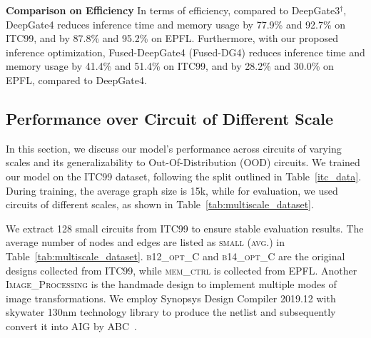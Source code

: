 \noindent\textbf{Comparison on Efficiency}
In terms of efficiency, compared to DeepGate3$^\dag$, DeepGate4 reduces inference time and memory usage by 77.9\% and 92.7\% on ITC99, and by 87.8\% and 95.2\% on EPFL. Furthermore, with our proposed inference optimization, Fused-DeepGate4 (Fused-DG4) reduces inference time and memory usage by 41.4\% and 51.4\% on ITC99, and by 28.2\% and 30.0\% on EPFL, compared to DeepGate4.


\vspace{-10pt}
\subsection{Performance over Circuit of Different Scale}
\vspace{-5pt}
In this section, we discuss our model's performance across circuits of varying scales and its generalizability to Out-Of-Distribution (OOD) circuits. We trained our model on the ITC99 dataset, following the split outlined in Table~\ref{itc_data}. During training, the average graph size is 15k, while for evaluation, we used circuits of different scales, as shown in Table~\ref{tab:multiscale_dataset}. 

\begin{minipage}[]{0.55\linewidth}
    We extract 128 small circuits from ITC99 to ensure stable evaluation results. The average number of nodes and edges are listed as \textsc{small (avg.)} in Table~\ref{tab:multiscale_dataset}. 
    \textsc{b12\_opt\_C} and \textsc{b14\_opt\_C} are the original designs collected from ITC99, while \textsc{mem\_ctrl} is collected from EPFL. Another \textsc{Image\_Processing} is the handmade design to implement multiple modes of image transformations. We employ Synopsys Design Compiler 2019.12 with skywater 130nm technology library to produce the netlist and subsequently convert it into AIG by ABC~\citep{brayton2010abc}. 
\end{minipage}
\hspace{5pt}
\begin{minipage}[]{0.4\linewidth}
\label{tab:multiscale_dataset}
\end{minipage}




